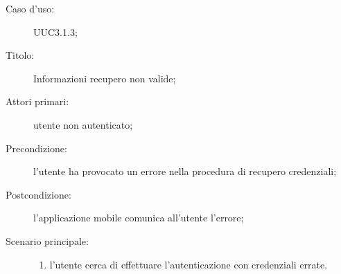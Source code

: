 \documentclass[../../../analisi-dei-requisiti.tex]{subfiles}
\begin{document}
\begin{description}
  \item[Caso d’uso:] UUC3.1.3;
  \item[Titolo:] Informazioni recupero non valide;
  \item[Attori primari:] utente non autenticato;
  \item[Precondizione:] l'utente ha provocato un errore nella procedura di recupero credenziali;
  \item[Postcondizione:] l'applicazione mobile comunica all'utente l'errore;
  \item[Scenario principale:]
        \begin{enumerate}
          \item l'utente cerca di effettuare l'autenticazione con credenziali errate.
        \end{enumerate}
\end{description}
\end{document}
